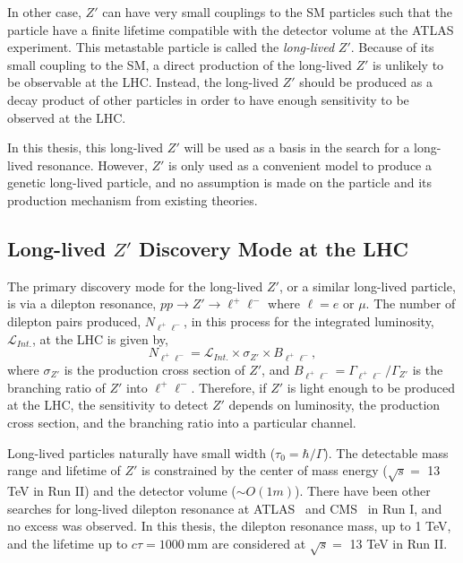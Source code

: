 In other case, $Z'$ can have very small couplings to the SM particles such that the particle have a finite lifetime compatible with the detector volume at the ATLAS experiment. This metastable particle is called the \textit{long-lived} $Z'$. Because of its small coupling to the SM, a direct production of the long-lived $Z'$ is unlikely to be observable at the LHC. Instead, the long-lived $Z'$ should be produced as a decay product of other particles in order to have enough sensitivity to be observed at the LHC. 

In this thesis, this long-lived $Z'$ will be used as a basis in the search for a long-lived resonance. However, $Z'$ is only used as a convenient model to produce a genetic long-lived particle, and no assumption is made on the particle and its production mechanism from existing theories.


\subsection{Long-lived \texorpdfstring{$Z'$}{Z'} Discovery Mode at the LHC}
\label{sec:intro:zprime_discovery}

The primary discovery mode for the long-lived $Z'$, or a similar long-lived particle, is via a dilepton resonance, $pp \rightarrow Z' \rightarrow  \ell^{+}\ell^{-}$ where $\ell= e$ or $\mu$. The number of dilepton pairs produced, $N_{\ell^{+}\ell^{-}}$, in this process for the integrated luminosity, $\mathcal{L}_{Int.}$, at the LHC is given by,
%
\begin{equation}
\label{eq:cross_section}
N_{\ell^{+}\ell^{-}} = \mathcal{L}_{Int.} \times \sigma_{Z'} \times B_{\ell^{+}\ell^{-}},
\end{equation}
%
where $\sigma_{Z'}$ is the production cross section of $Z'$, and $B_{\ell^{+}\ell^{-}} = \Gamma_{\ell^{+}\ell^{-}} / \Gamma_{Z'}$ is the branching ratio of $Z'$ into $\ell^{+}\ell^{-}$. Therefore, if $Z'$ is light enough to be produced at the LHC, the sensitivity to detect $Z'$ depends on luminosity, the production cross section, and the branching ratio into a particular channel.

Long-lived particles naturally have small width ($\tau_{0} = \hbar / \Gamma$). The detectable mass range and lifetime of $Z'$ is constrained by the center of mass energy ($\sqrt{s} = $ 13 TeV in Run II) and the detector volume ($\sim O(1m)$). There have been other searches for long-lived dilepton resonance at ATLAS~\cite{Aad:2010949} and CMS~\cite{Chatrchyan:1493239} in Run I, and no excess was observed. In this thesis, the dilepton resonance mass, up to 1 TeV, and the lifetime up to $c\tau= 1000~\si{\mm}$ are considered at $\sqrt{s}=$ 13 TeV in Run II.

